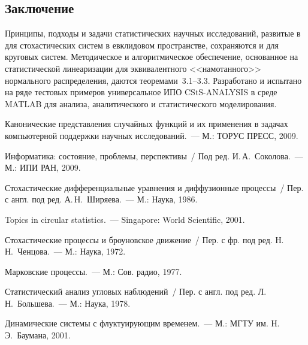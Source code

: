 \begin{multicols}{2}
\section{Заключение}

Принципы, подходы и задачи статистических научных исследований,
развитые в~\cite{1-sin} для стохастических систем в евклидовом пространстве,
сохраняются и для круговых систем. Методическое и алгоритмическое
обеспечение, основанное на статистической линеаризации для
эквивалентного <<намотанного>> нормального распределения, даются
теоремами~3.1--3.3. Разработано и испытано на ряде тестовых примеров
универсальное ИПО CStS-ANALYSIS
в среде  MATLAB для анализа, аналитического и статистического
моделирования.

{\small\frenchspacing
{%
\begin{thebibliography}{99}

Канонические представления случайных функций и их применения в 
задачах компьютерной поддержки научных исследований.~--- М.: ТОРУС ПРЕСС, 2009.

Информатика: состояние, проблемы, перспективы~/ Под ред.  И.\,А.~Соколова.~--- М.: ИПИ РАН, 2009.

 Стохастические дифференциальные уравнения и диффузионные процессы~/ Пер. с англ. 
 под ред.  А.\,Н.~Ширяева.~--- М.: Наука, 1986.

  Topics in circular statistics.~--- Singapore: World Scientific, 2001.

 Стохастические процессы и броуновское движение~/ Пер. с фр.  под ред. Н.\,Н.~Ченцова.~--- М.: Наука, 1972.

 Марковские процессы.~--- М.: Сов. радио, 1977.

Статистический анализ угловых наблюдений~/ Пер. с англ. под ред. Л.\,Н.~Большева.~--- М.: Наука, 1978.

 Динамические системы с флуктуирующим временем.~--- М.: МГТУ им. Н.\,Э.~Баумана, 2001.

 \columnbreak



\end{thebibliography}}}
\end{multicols}
